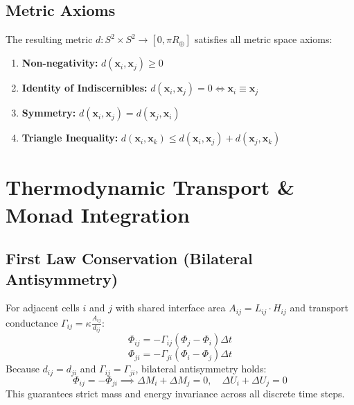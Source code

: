 \documentclass[11pt,a4paper]{article}
\begin{document}
\subsection{Metric Axioms}
The resulting metric $d: S^2 \times S^2 \to [0, \pi R_\oplus]$ satisfies all metric space axioms:
\begin{enumerate}
    \item \textbf{Non-negativity:} $d(\mathbf{x}_i, \mathbf{x}_j) \ge 0$
    \item \textbf{Identity of Indiscernibles:} $d(\mathbf{x}_i, \mathbf{x}_j) = 0 \iff \mathbf{x}_i \equiv \mathbf{x}_j$
    \item \textbf{Symmetry:} $d(\mathbf{x}_i, \mathbf{x}_j) = d(\mathbf{x}_j, \mathbf{x}_i)$
    \item \textbf{Triangle Inequality:} $d(\mathbf{x}_i, \mathbf{x}_k) \le d(\mathbf{x}_i, \mathbf{x}_j) + d(\mathbf{x}_j, \mathbf{x}_k)$
\end{enumerate}

\section{Thermodynamic Transport \& Monad Integration}

\subsection{First Law Conservation (Bilateral Antisymmetry)}
For adjacent cells $i$ and $j$ with shared interface area $A_{ij} = L_{ij} \cdot H_{ij}$ and transport conductance $\Gamma_{ij} = \kappa \frac{A_{ij}}{d_{ij}}$:
\begin{equation}
    \Phi_{ij} = -\Gamma_{ij} (\Phi_j - \Phi_i) \Delta t
\end{equation}
\begin{equation}
    \Phi_{ji} = -\Gamma_{ji} (\Phi_i - \Phi_j) \Delta t
\end{equation}
Because $d_{ij} = d_{ji}$ and $\Gamma_{ij} = \Gamma_{ji}$, bilateral antisymmetry holds:
\begin{equation}
    \Phi_{ij} = -\Phi_{ji} \implies \Delta M_i + \Delta M_j = 0, \quad \Delta U_i + \Delta U_j = 0
\end{equation}
This guarantees strict mass and energy invariance across all discrete time steps.
\end{document}
